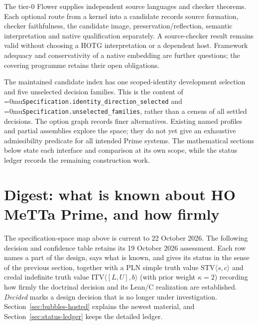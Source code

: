 \documentclass[11pt]{article}
\newcommand{\leanname}[1]{\textup{\Urlmuskip=0mu\relax\nolinkurl{#1}}}
\theoremstyle{definition}
\theoremstyle{remark}
\begin{document}
The tier-0 Flower supplies independent source languages and checker theorems.
Each optional route from a kernel into a candidate records source formation,
checker faithfulness, the candidate image, preservation/reflection, semantic
interpretation and native qualification separately. A source-checker result
remains valid without choosing a HOTG interpretation or a dependent host.
Framework adequacy and conservativity of a native embedding are further
questions; the covering programme retains their open obligations.

The maintained candidate index has one scoped-identity development selection
and five unselected decision families. This is the content of
\leanname{Specification.identity_direction_selected} and
\leanname{Specification.unselected_families}, rather than a census of all
settled decisions. The option graph records finer alternatives. Existing
named profiles and partial assemblies explore the space; they do not yet
give an exhaustive admissibility predicate for all intended Prime systems.
The mathematical sections below state each interface and comparison at its
own scope, while the status ledger records the remaining construction work.

\section{Digest: what is known about HO MeTTa Prime, and how firmly}
\label{sec:digest}

The specification-space map above is current to 22 October 2026. The following
decision and confidence table retains its 19 October 2026 assessment. Each row
names a part of the design, says what is known, and gives its status in the
sense of the previous section, together with a PLN simple truth value
$\mathrm{STV}\langle s, c\rangle$ and credal indefinite truth value
$\mathrm{ITV}\langle [L, U], b\rangle$ (with prior weight $\kappa = 2$)
recording how firmly the doctrinal decision and its Lean/C realization are
established. \emph{Decided} marks a design decision that is
no longer under investigation.
Section~\ref{sec:bubbles-hosted} explains the newest material, and
Section~\ref{sec:status-ledger} keeps the detailed ledger.
\end{document}
